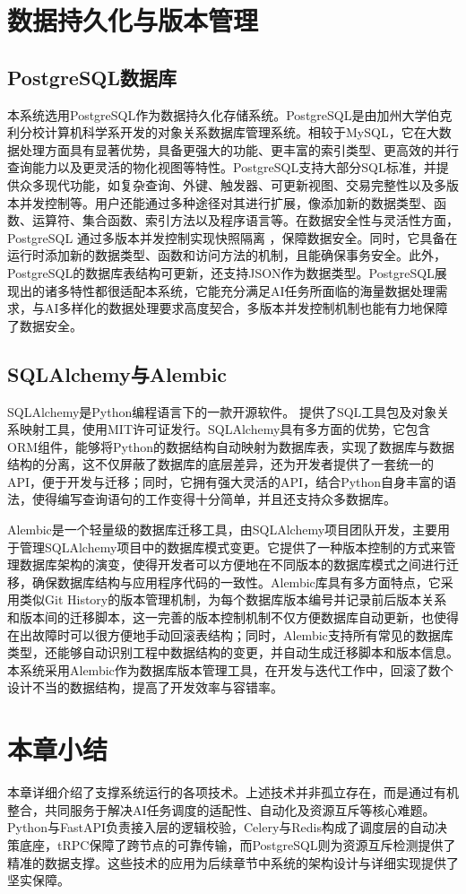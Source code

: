 \section{数据持久化与版本管理}

\subsection{PostgreSQL数据库}

本系统选用PostgreSQL作为数据持久化存储系统。PostgreSQL是由加州大学伯克利分校计算机科学系开发的对象关系数据库管理系统\cite{3}。相较于MySQL，它在大数据处理方面具有显著优势，具备更强大的功能、更丰富的索引类型、更高效的并行查询能力以及更灵活的物化视图等特性\cite{18}。PostgreSQL支持大部分SQL标准，并提供众多现代功能，如复杂查询、外键、触发器、可更新视图、交易完整性以及多版本并发控制等。用户还能通过多种途径对其进行扩展，像添加新的数据类型、函数、运算符、集合函数、索引方法以及程序语言等\cite{4}。在数据安全性与灵活性方面，PostgreSQL 通过多版本并发控制实现快照隔离 \cite{17}，保障数据安全。同时，它具备在运行时添加新的数据类型、函数和访问方法的机制\cite{19}，且能确保事务安全\cite{9520330}。此外，PostgreSQL的数据库表结构可更新，还支持JSON作为数据类型。PostgreSQL展现出的诸多特性都很适配本系统，它能充分满足AI任务所面临的海量数据处理需求，与AI多样化的数据处理要求高度契合，多版本并发控制机制也能有力地保障了数据安全。 

\subsection{SQLAlchemy与Alembic}

SQLAlchemy是Python编程语言下的一款开源软件。 提供了SQL工具包及对象关系映射工具，使用MIT许可证发行\cite{5}。SQLAlchemy具有多方面的优势，它包含ORM组件，能够将Python的数据结构自动映射为数据库表，实现了数据库与数据结构的分离，这不仅屏蔽了数据库的底层差异，还为开发者提供了一套统一的API，便于开发与迁移；同时，它拥有强大灵活的API，结合Python自身丰富的语法，使得编写查询语句的工作变得十分简单，并且还支持众多数据库。

Alembic是一个轻量级的数据库迁移工具，由SQLAlchemy项目团队开发，主要用于管理SQLAlchemy项目中的数据库模式变更。它提供了一种版本控制的方式来管理数据库架构的演变，使得开发者可以方便地在不同版本的数据库模式之间进行迁移，确保数据库结构与应用程序代码的一致性。Alembic库具有多方面特点，它采用类似Git History的版本管理机制，为每个数据库版本编号并记录前后版本关系和版本间的迁移脚本，这一完善的版本控制机制不仅方便数据库自动更新，也使得在出故障时可以很方便地手动回滚表结构；同时，Alembic支持所有常见的数据库类型，还能够自动识别工程中数据结构的变更，并自动生成迁移脚本和版本信息。本系统采用Alembic作为数据库版本管理工具，在开发与迭代工作中，回滚了数个设计不当的数据结构，提高了开发效率与容错率。

\section{本章小结}

本章详细介绍了支撑系统运行的各项技术。上述技术并非孤立存在，而是通过有机整合，共同服务于解决AI任务调度的适配性、自动化及资源互斥等核心难题。Python与FastAPI负责接入层的逻辑校验，Celery与Redis构成了调度层的自动决策底座，tRPC保障了跨节点的可靠传输，而PostgreSQL则为资源互斥检测提供了精准的数据支撑。这些技术的应用为后续章节中系统的架构设计与详细实现提供了坚实保障。

\makeatletter

\@openrightfalse

\makeatother